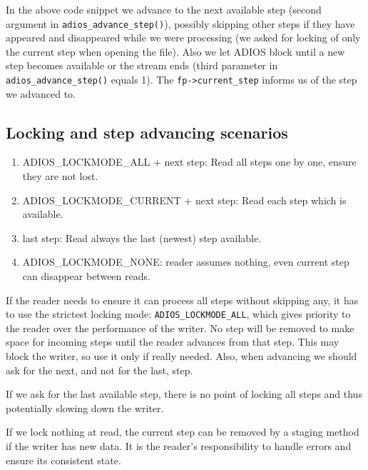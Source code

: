 \noindent In the above code snippet we advance to the next available step (second argument in \verb+adios_advance_step()+), possibly skipping other steps if they have appeared and disappeared while we were processing (we asked for locking of only the current step when opening the file). Also we let ADIOS block until a new step becomes available or the stream ends (third parameter in \verb+adios_advance_step()+ equals 1). The \verb+fp->current_step+ informs us of the step we advanced to.


\subsection{Locking and step advancing scenarios}
  \begin{enumerate}  
  \item ADIOS\_LOCKMODE\_ALL + next step: Read all steps one by one, ensure they are not lost. 
  \item ADIOS\_LOCKMODE\_CURRENT + next step: Read each step which is available. 
  \item last step: Read always the last (newest) step available.
  \item ADIOS\_LOCKMODE\_NONE: reader assumes nothing, even current step can disappear between reads.
  \end{enumerate}

If the reader needs to ensure it can process all steps without skipping any, it has to use the strictest locking mode: \verb+ADIOS_LOCKMODE_ALL+, which gives priority to the reader over the performance of the writer. No step will be removed to make space for incoming steps until the reader advances from that step. This may block the writer, so use it only if really needed. Also, when advancing we should ask for the next, and not for the last, step. 

If we ask for the last available step, there is no point of locking all steps and thus potentially slowing down the writer. 

If we lock nothing at read, the current step can be removed by a staging method if the writer has new data. It is the reader's responsibility to handle errors and ensure its consistent state. 

